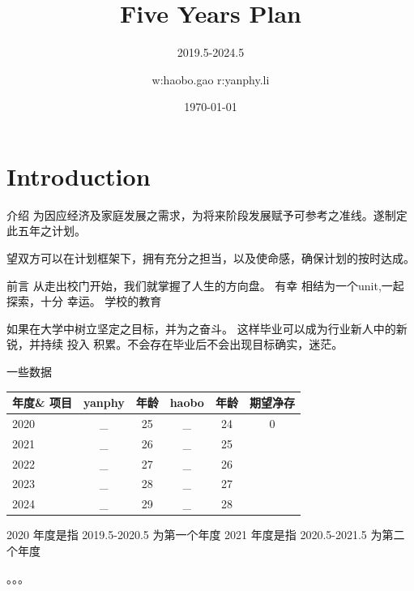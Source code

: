 \documentclass[10pt]{beamer}
\title{Five Years Plan}
\subtitle{2019.5-2024.5}
\date{\today}
\author{w:haobo.gao r:yanphy.li}
\institute{ZhengZhou}
\begin{document}
\begin{frame}
	\titlepage
\end{frame}



\section{Introduction}

\begin{frame}[fragile]{介绍}
		为因应经济及家庭发展之需求，为将来阶段发展赋予可参考之准线。遂制定此五年之计划。

		望双方可以在计划框架下，拥有充分之担当，以及使命感，确保计划的按时达成。
\end{frame}


\begin{frame}[fragile]{前言}
	从走出校门开始，我们就掌握了人生的方向盘。 有幸 相结为一个unit,一起探索，十分
幸运。
	 学校的教育

	 如果在大学中树立坚定之目标，并为之奋斗。 这样毕业可以成为行业新人中的新锐，并持续 投入
积累。不会存在毕业后不会出现目标确实，迷茫。



\end{frame}

\begin{frame}[fragile]{一些数据}
		\begin{center}
		\begin{tabular}{|l|c|c|c|c|c|}
		\hline
		年度\& 项目	&	yanphy & 年龄 & haobo & 年龄 & 期望净存 \\
		\hline
		2020 & \_ &	25  &	\_ & 24  &   0  \\
		2021 & \_ & 26	& \_ & 25  &     \\
		2022 & \_ & 27  & \_ & 26  &     \\
		2023 & \_ & 28  & \_ & 27  &     \\
		2024 & \_ & 29  & \_ & 28  &     \\
		\hline
		\end{tabular}
		\end{center}
		2020 年度是指 2019.5-2020.5 为第一个年度
		2021 年度是指 2020.5-2021.5 为第二个年度

		。。。

\end{frame}
\end{document}
